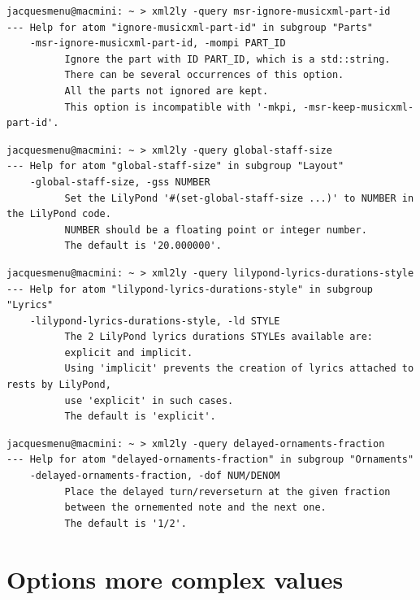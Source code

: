 \begin{lstlisting}[language=Terminal]
jacquesmenu@macmini: ~ > xml2ly -query msr-ignore-musicxml-part-id
--- Help for atom "ignore-musicxml-part-id" in subgroup "Parts"
    -msr-ignore-musicxml-part-id, -mompi PART_ID
          Ignore the part with ID PART_ID, which is a std::string.
          There can be several occurrences of this option.
          All the parts not ignored are kept.
          This option is incompatible with '-mkpi, -msr-keep-musicxml-part-id'.
\end{lstlisting}

\begin{lstlisting}[language=Terminal]
jacquesmenu@macmini: ~ > xml2ly -query global-staff-size
--- Help for atom "global-staff-size" in subgroup "Layout"
    -global-staff-size, -gss NUMBER
          Set the LilyPond '#(set-global-staff-size ...)' to NUMBER in the LilyPond code.
          NUMBER should be a floating point or integer number.
          The default is '20.000000'.
\end{lstlisting}

\begin{lstlisting}[language=Terminal]
jacquesmenu@macmini: ~ > xml2ly -query lilypond-lyrics-durations-style
--- Help for atom "lilypond-lyrics-durations-style" in subgroup "Lyrics"
    -lilypond-lyrics-durations-style, -ld STYLE
          The 2 LilyPond lyrics durations STYLEs available are:
          explicit and implicit.
          Using 'implicit' prevents the creation of lyrics attached to rests by LilyPond,
          use 'explicit' in such cases.
          The default is 'explicit'.
\end{lstlisting}

\begin{lstlisting}[language=Terminal]
jacquesmenu@macmini: ~ > xml2ly -query delayed-ornaments-fraction
--- Help for atom "delayed-ornaments-fraction" in subgroup "Ornaments"
    -delayed-ornaments-fraction, -dof NUM/DENOM
          Place the delayed turn/reverseturn at the given fraction
          between the ornemented note and the next one.
          The default is '1/2'.
\end{lstlisting}


\section{Options more complex values}\label{Options more complex values}

